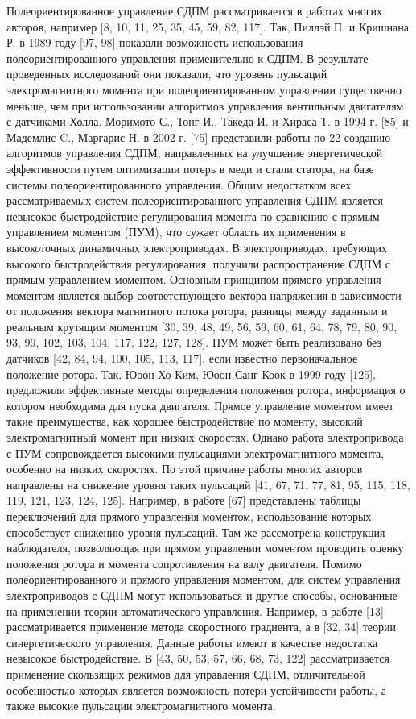 Полеориентированное управление СДПМ рассматривается в работах многих авторов, например [8, 10, 11, 25, 35, 45, 59, 82, 117]. Так, Пиллэй П. и Кришнана Р. в 1989 году [97, 98] показали возможность использования полеориентированного управления применительно к СДПМ. В результате проведенных исследований они показали, что уровень пульсаций электромагнитного момента при полеориентированном управлении существенно меньше, чем при использовании алгоритмов управления вентильным двигателям с датчиками Холла. 
Моримото С., Тонг И., Такеда И. и Хираса Т. в 1994 г. [85] и Мадемлис C., Маргарис Н. в 2002 г. [75] представили работы по 22 созданию алгоритмов управления СДПМ, направленных на улучшение энергетической эффективности путем оптимизации потерь в меди и стали статора, на базе системы полеориентированного управления. 
Общим недостатком всех рассматриваемых систем полеориентированного управления СДПМ является невысокое быстродействие регулирования момента по сравнению с прямым управлением моментом (ПУМ), что сужает область их применения в высокоточных динамичных электроприводах. 
В электроприводах, требующих высокого быстродействия регулирования, получили распространение СДПМ с прямым управлением моментом. Основным принципом прямого управления моментом является выбор соответствующего вектора напряжения в зависимости от положения вектора магнитного потока ротора, разницы между заданным и реальным крутящим моментом [30, 39, 48, 49, 56, 59, 60, 61, 64, 78, 79, 80, 90, 93, 99, 102, 103, 104, 117, 122, 127, 128].
ПУМ может быть реализовано без датчиков [42, 84, 94, 100, 105, 113, 117], если известно первоначальное положение ротора. Так, Юоон-Хо Ким, Юоон-Санг Коок в 1999 году [125], предложили эффективные методы определения положения ротора, информация о котором необходима для пуска двигателя.
Прямое управление моментом имеет такие преимущества, как хорошее быстродействие по моменту, высокий электромагнитный момент при низких скоростях. Однако работа электропривода с ПУМ сопровождается высокими пульсациями электромагнитного момента, особенно на низких скоростях. По этой причине работы многих авторов направлены на снижение уровня таких пульсаций [41, 67, 71, 77, 81, 95, 115, 118, 119, 121, 123, 124, 125]. Например, в работе [67] представлены таблицы переключений для прямого управления моментом, использование которых способствует снижению уровня пульсаций. Там же рассмотрена конструкция наблюдателя, позволяющая при прямом управлении моментом проводить оценку положения ротора и момента сопротивления на валу двигателя. 
Помимо полеориентированного и прямого управления моментом, для систем управления электроприводов с СДПМ могут использоваться и другие способы, основанные на применении теории автоматического управления. Например, в работе [13] рассматривается применение метода скоростного градиента, а в [32, 34] теории синергетического управления. Данные работы имеют в качестве недостатка невысокое быстродействие. В [43, 50, 53, 57, 66, 68, 73, 122] рассматривается применение скользящих режимов для управления СДПМ, отличительной особенностью которых является возможность потери устойчивости работы, а также высокие пульсации электромагнитного момента. 
